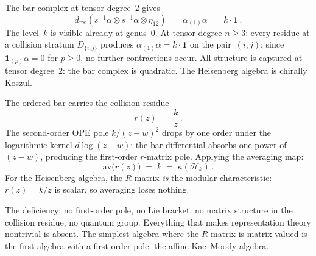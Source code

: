 \documentclass[11pt,reqno]{amsart}
\theoremstyle{definition}
\theoremstyle{remark}
\newcommand{\cH}{\mathcal{H}}
\numberwithin{equation}{section}
\begin{document}
The bar complex at tensor degree~$2$ gives
\begin{equation}\label{eq:heis-bar2}
d_{\mathrm{res}}
(s^{-1}\alpha \otimes s^{-1}\alpha \otimes \eta_{12})
\;=\;
\alpha_{(1)}\alpha
\;=\;
k \cdot \mathbf{1}\,.
\end{equation}
The level~$k$ is visible already at genus~$0$. At tensor
degree $n \ge 3$: every residue at a collision stratum
$D_{\{i,j\}}$ produces $\alpha_{(1)}\alpha = k \cdot \mathbf{1}$
on the pair~$(i,j)$; since $\mathbf{1}_{(p)}\alpha = 0$ for
$p \ge 0$, no further contractions occur. All structure is
captured at tensor degree~$2$: the bar complex is quadratic.
The Heisenberg algebra is chirally Koszul.

The ordered bar carries the collision residue
\begin{equation}\label{eq:heis-r}
r(z) \;=\; \frac{k}{z}\,.
\end{equation}
The second-order OPE pole $k/(z-w)^2$ drops by one order under
the logarithmic kernel $d\log(z-w)$: the bar differential
absorbs one power of $(z-w)$, producing the first-order
$r$-matrix pole. Applying the averaging map:
\begin{equation}\label{eq:heis-kappa}
\mathrm{av}\bigl(r(z)\bigr)
\;=\;
k
\;=\;
\kappa(\cH_k)\,.
\end{equation}
For the Heisenberg algebra, the $R$-matrix \emph{is}
the modular characteristic: $r(z) = k/z$ is scalar, so
averaging loses nothing.

The deficiency: no first-order pole, no Lie bracket, no
matrix structure in the collision residue, no quantum group.
Everything that makes representation theory nontrivial is
absent. The simplest algebra where the $R$-matrix is
matrix-valued is the first algebra with a first-order pole:
the affine Kac--Moody algebra.
\end{document}
